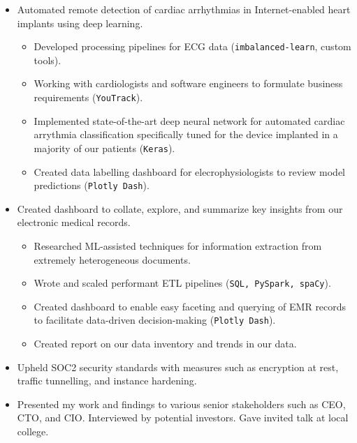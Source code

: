 \documentclass[a4paper,12pt]{article}
\begin{document}
    \begin{itemize}

        \item  Automated remote detection of cardiac arrhythmias in Internet-enabled heart implants using deep learning.
        \begin{itemize}
            \item Developed processing pipelines for ECG data (\texttt{imbalanced-learn}, custom tools).
            \item Working with cardiologists and software engineers to formulate business requirements (\texttt{YouTrack}).
            \item Implemented state-of-the-art deep neural network for automated cardiac arrythmia classification specifically tuned for the device implanted in a majority of our patients (\texttt{Keras}).
            \item Created data labelling dashboard for elecrophysiologists to review model predictions (\texttt{Plotly Dash}).
        \end{itemize}

        \item Created dashboard to collate, explore, and summarize key insights from our electronic medical records.
        \begin{itemize}
            \item Researched ML-assisted techniques for information extraction from extremely heterogeneous documents.
            \item Wrote and scaled performant ETL pipelines (\texttt{SQL, PySpark, spaCy}).
            \item Created dashboard to enable easy faceting and querying of EMR records to facilitate data-driven decision-making (\texttt{Plotly Dash}).
            \item Created report on our data inventory and trends in our data.
        \end{itemize}


        \item Upheld SOC2 security standards with measures such as encryption at rest, traffic tunnelling, and instance hardening.
        \item Presented my work and findings to various senior stakeholders such as CEO, CTO, and CIO. Interviewed by potential investors.
        Gave invited talk at local college.

    \end{itemize}
\end{document}
